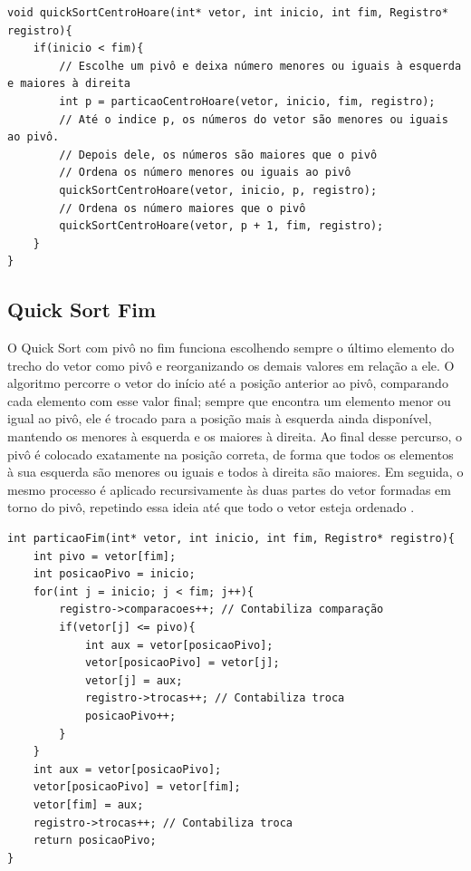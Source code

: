 \documentclass[12pt]{article}
\begin{document}
\begin{lstlisting}
void quickSortCentroHoare(int* vetor, int inicio, int fim, Registro* registro){
    if(inicio < fim){
        // Escolhe um pivô e deixa número menores ou iguais à esquerda e maiores à direita
        int p = particaoCentroHoare(vetor, inicio, fim, registro);		
        // Até o indice p, os números do vetor são menores ou iguais ao pivô. 
        // Depois dele, os números são maiores que o pivô
        // Ordena os número menores ou iguais ao pivô
        quickSortCentroHoare(vetor, inicio, p, registro);		
        // Ordena os número maiores que o pivô
        quickSortCentroHoare(vetor, p + 1, fim, registro);	
    }
}
\end{lstlisting}

\subsection{Quick Sort Fim}

O Quick Sort com pivô no fim funciona escolhendo sempre o último elemento do trecho do vetor como pivô e reorganizando os demais valores em relação a ele. O algoritmo percorre o vetor do início até a posição anterior ao pivô, comparando cada elemento com esse valor final; sempre que encontra um elemento menor ou igual ao pivô, ele é trocado para a posição mais à esquerda ainda disponível, mantendo os menores à esquerda e os maiores à direita. Ao final desse percurso, o pivô é colocado exatamente na posição correta, de forma que todos os elementos à sua esquerda são menores ou iguais e todos à direita são maiores. Em seguida, o mesmo processo é aplicado recursivamente às duas partes do vetor formadas em torno do pivô, repetindo essa ideia até que todo o vetor esteja ordenado \cite{cormen2009}.

\begin{lstlisting}
int particaoFim(int* vetor, int inicio, int fim, Registro* registro){
    int pivo = vetor[fim];
    int posicaoPivo = inicio;
    for(int j = inicio; j < fim; j++){
        registro->comparacoes++; // Contabiliza comparação
        if(vetor[j] <= pivo){
            int aux = vetor[posicaoPivo];
            vetor[posicaoPivo] = vetor[j];
            vetor[j] = aux;
            registro->trocas++; // Contabiliza troca
            posicaoPivo++;
        }
    }  
    int aux = vetor[posicaoPivo];
    vetor[posicaoPivo] = vetor[fim];
    vetor[fim] = aux;
    registro->trocas++; // Contabiliza troca
    return posicaoPivo;
}
\end{lstlisting}
\end{document}
